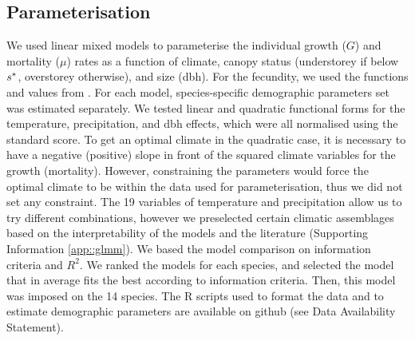 \subsection{Parameterisation}
We used linear mixed models to parameterise the individual growth ($ G $) and mortality ($ \mu $) rates as a function of climate, canopy status (understorey if below $ {s}^{*} $, overstorey otherwise), and size (dbh). For the fecundity, we used the functions and values from \citet{Purves2008}. For each model, species-specific demographic parameters set was estimated separately. We tested linear and quadratic functional forms for the temperature, precipitation, and dbh effects, which were all normalised using the standard score. To get an optimal climate in the quadratic case, it is necessary to have a negative (positive) slope in front of the squared climate variables for the growth (mortality). However, constraining the parameters would force the optimal climate to be within the data used for parameterisation, thus we did not set any constraint. The 19 variables of temperature and precipitation allow us to try different combinations, however we preselected certain climatic assemblages based on the interpretability of the models and the literature (Supporting Information \ref{app::glmm}). We based the model comparison on information criteria and $ R^2 $. We ranked the models for each species, and selected the model that in average fits the best according to information criteria. Then, this model was imposed on the 14 species. The R scripts used to format the data and to estimate demographic parameters are available on github (see Data Availability Statement). 

